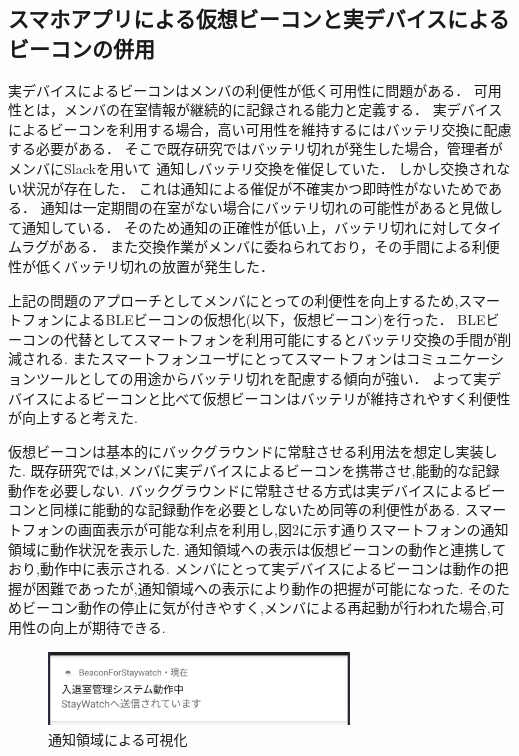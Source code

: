 
\subsection{スマホアプリによる仮想ビーコンと実デバイスによるビーコンの併用}


実デバイスによるビーコンはメンバの利便性が低く可用性に問題がある．
可用性とは，メンバの在室情報が継続的に記録される能力と定義する．
実デバイスによるビーコンを利用する場合，高い可用性を維持するにはバッテリ交換に配慮する必要がある．
そこで既存研究ではバッテリ切れが発生した場合，管理者がメンバにSlackを用いて
通知しバッテリ交換を催促していた．
しかし交換されない状況が存在した．
これは通知による催促が不確実かつ即時性がないためである．
通知は一定期間の在室がない場合にバッテリ切れの可能性があると見做して通知している．
そのため通知の正確性が低い上，バッテリ切れに対してタイムラグがある．
また交換作業がメンバに委ねられており，その手間による利便性が低くバッテリ切れの放置が発生した．


上記の問題のアプローチとしてメンバにとっての利便性を向上するため,スマートフォンによるBLEビーコンの仮想化(以下，仮想ビーコン)を行った．
BLEビーコンの代替としてスマートフォンを利用可能にするとバッテリ交換の手間が削減される.
またスマートフォンユーザにとってスマートフォンはコミュニケーションツールとしての用途からバッテリ切れを配慮する傾向が強い．
よって実デバイスによるビーコンと比べて仮想ビーコンはバッテリが維持されやすく利便性が向上すると考えた.

仮想ビーコンは基本的にバックグラウンドに常駐させる利用法を想定し実装した.
既存研究では,メンバに実デバイスによるビーコンを携帯させ,能動的な記録動作を必要しない.
バックグラウンドに常駐させる方式は実デバイスによるビーコンと同様に能動的な記録動作を必要としないため同等の利便性がある.
スマートフォンの画面表示が可能な利点を利用し,図2に示す通りスマートフォンの通知領域に動作状況を表示した.
通知領域への表示は仮想ビーコンの動作と連携しており,動作中に表示される.
メンバにとって実デバイスによるビーコンは動作の把握が困難であったが,通知領域への表示により動作の把握が可能になった.
そのためビーコン動作の停止に気が付きやすく,メンバによる再起動が行われた場合,可用性の向上が期待できる.


\begin{figure}[tbh]
  \centering
  \includegraphics[width=8cm]{image/notify.jpg}
  \caption{通知領域による可視化}
  \label{multipleBPM}
\end{figure}



